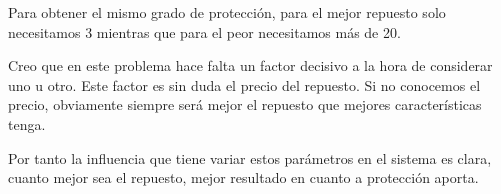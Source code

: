 Para obtener el mismo grado de protección, para el mejor repuesto solo necesitamos 3 mientras que para el peor necesitamos más de 20.

Creo que en este problema hace falta un factor decisivo a la hora de considerar uno u otro. Este factor es sin duda el precio del repuesto. Si no conocemos el precio, obviamente siempre será mejor el repuesto que mejores características tenga.

Por tanto la influencia que tiene variar estos parámetros en el sistema es clara, cuanto mejor sea el repuesto, mejor resultado en cuanto a protección aporta.
